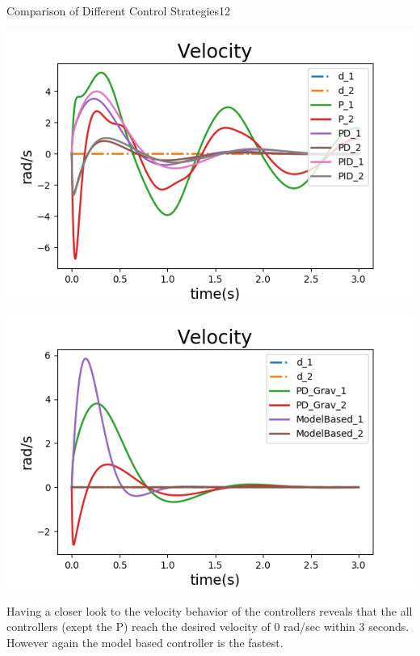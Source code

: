 \begin{questions}
\begin{question}{Comparison of Different Control Strategies}{12}
\begin{answer}
\noindent\begin{minipage}{.5\textwidth}
	\centering
	\includegraphics[width=1\textwidth]{img/2cvel1.png} 
	\label{fig:2cvel1}            
\end{minipage}%
\begin{minipage}{.5\textwidth}
	\centering
	\includegraphics[width=1\textwidth]{img/2cvel2.png} 
	\label{fig:2cvel2}               
\end{minipage}

Having a closer look to the velocity behavior of the controllers reveals that the all controllers (exept the P) reach the desired velocity of 0 rad/sec within 3 seconds. However again the model based controller is the fastest. 


\end{answer}
\end{question}
\end{questions}
